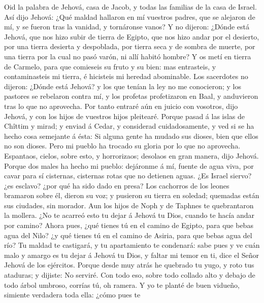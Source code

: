  Oid la palabra de Jehová, casa de Jacob, y todas las
familias de la casa de Israel.  Así dijo Jehová: ¿Qué maldad
hallaron en mí vuestros padres, que se alejaron de mí, y se fueron tras
la vanidad, y tornáronse vanos?  Y no dijeron: ¿Dónde está
Jehová, que nos hizo subir de tierra de Egipto, que nos hizo andar por
el desierto, por una tierra desierta y despoblada, por tierra seca y de
sombra de muerte, por una tierra por la cual no pasó varón, ni allí
habitó hombre?  Y os metí en tierra de Carmelo, para que
comieseis su fruto y su bien: mas entrasteis, y contaminasteis mi
tierra, é hicisteis mi heredad abominable.  Los sacerdotes
no dijeron: ¿Dónde está Jehová? y los que tenían la ley no me
conocieron; y los pastores se rebelaron contra mí, y los profetas
profetizaron en Baal, y anduvieron tras lo que no aprovecha.
 Por tanto entraré aún en juicio con vosotros, dijo Jehová,
y con los hijos de vuestros hijos pleitearé.  Porque pasad
á las islas de Chîttim y mirad; y enviad á Cedar, y considerad
cuidadosamente, y ved si se ha hecho cosa semejante á ésta:
 Si alguna gente ha mudado sus dioses, bien que ellos no
son dioses. Pero mi pueblo ha trocado su gloria por lo que no aprovecha.
 Espantaos, cielos, sobre esto, y horrorizaos; desolaos en
gran manera, dijo Jehová.  Porque dos males ha hecho mi
pueblo: dejáronme á mí, fuente de agua viva, por cavar para sí
cisternas, cisternas rotas que no detienen aguas.  ¿Es
Israel siervo? ¿es esclavo? ¿por qué ha sido dado en presa?
 Los cachorros de los leones bramaron sobre él, dieron su
voz; y pusieron su tierra en soledad; quemadas están sus ciudades, sin
morador.  Aun los hijos de Noph y de Taphnes te
quebrantaron la mollera.  ¿No te acarreó esto tu dejar á
Jehová tu Dios, cuando te hacía andar por camino?  Ahora
pues, ¿qué tienes tú en el camino de Egipto, para que bebas agua del
Nilo? ¿y qué tienes tú en el camino de Asiria, para que bebas agua del
río?  Tu maldad te castigará, y tu apartamiento te
condenará: sabe pues y ve cuán malo y amargo es tu dejar á Jehová tu
Dios, y faltar mi temor en ti, dice el Señor Jehová de los ejércitos.
 Porque desde muy atrás he quebrado tu yugo, y roto tus
ataduras; y dijiste: No serviré. Con todo eso, sobre todo collado alto y
debajo de todo árbol umbroso, corrías tú, oh ramera.  Y yo
te planté de buen vidueño, simiente verdadera toda ella: ¿cómo pues te
